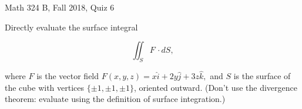 \documentclass{exam}
\begin{document}
 
\begin{center} \begin{Large} Math 324 B, Fall 2018, Quiz 6\end{Large}
\end{center} 

\vspace{5mm}

\begin{center}
\end{center}

\vspace{1cm}
 

\vspace{1cm}

\begin{questions}
\question Directly evaluate the surface integral

\[
\iint_S F \, \cdot dS,
\]

where $F$ is the vector field $F(x,y,z) = x \hat{i} + 2y\hat{j} + 3z \hat{k},$ and $S$ is the surface of the cube with vertices $\{\pm 1, \pm 1, \pm 1\}$, oriented outward. (Don't use the divergence theorem: evaluate using the definition of surface integration.)


\end{questions}
\end{document}
